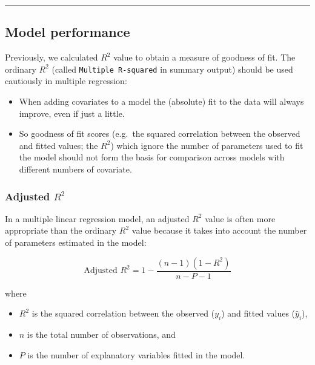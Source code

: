 \documentclass[
  oneside]{krantz}
\providecommand{\tightlist}{%
  \setlength{\itemsep}{0pt}\setlength{\parskip}{0pt}}
\begin{document}
\begin{center}\rule{0.5\linewidth}{0.5pt}\end{center}

\hypertarget{model-performance-1}{%
\subsection{Model performance}\label{model-performance-1}}

Previously, we calculated \(R^2\) value to obtain a measure of goodness of fit. The ordinary \(R^2\) (called \texttt{Multiple\ R-squared} in summary output) should be used cautiously in multiple regression:

\begin{itemize}
\tightlist
\item
  When adding covariates to a model the (absolute) fit to the data will always improve, even if just a little.\\
\item
  So goodness of fit scores (e.g.~the squared correlation between the observed and fitted values; the \(R^2\)) which ignore the number of parameters used to fit the model should not form the basis for comparison across models with different numbers of covariate.
\end{itemize}

\hypertarget{adjusted-r2}{%
\subsubsection{\texorpdfstring{Adjusted \(R^2\)}{Adjusted R\^{}2}}\label{adjusted-r2}}

In a multiple linear regression model, an adjusted \(R^2\) value is often more appropriate than the ordinary \(R^2\) value because it takes into account the number of parameters estimated in the model:

\[
\textrm{Adjusted } R^2 = 1-\frac{(n-1)(1-R^2)}{n-P-1}
\]

where

\begin{itemize}
\tightlist
\item
  \(R^2\) is the squared correlation between the observed (\({y}_{i}\)) and fitted values (\(\hat{y}_{i}\)),
\item
  \(n\) is the total number of observations, and
\item
  \(P\) is the number of explanatory variables fitted in the model.
\end{itemize}
\end{document}
